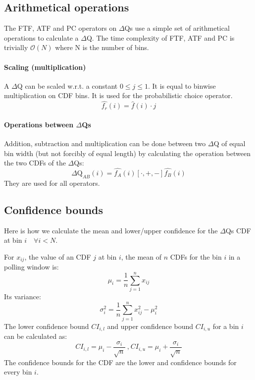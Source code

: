     \subsection{Arithmetical operations}
        The FTF, ATF and PC operators on $\Delta$Qs use a simple set of arithmetical operations to calculate a $\Delta$Q.   
    The time complexity of FTF, ATF and PC is trivially $\mathcal{O}(N)$ where N is the number of bins.
 
    \paragraph{Scaling (multiplication)} A $\Delta$Q can be scaled w.r.t. a constant $0 \le j \le 1$. It is equal to binwise multiplication on CDF bins. It is used for the probabilistic choice operator.
    \begin{equation}
        \hat{f_r}(i) = \hat{f}(i) \cdot j
        \label{eq:mul_ecdf}
    \end{equation}

    \paragraph{Operations between $\Delta$Qs} 
        Addition, subtraction and multiplication can be done between two $\Delta$Q of equal bin width (but not forcibly of equal length) by calculating the operation between the two CDFs of the $\Delta$Qs:
        \begin{equation}
            \Delta \text{Q}_{AB}(i) = \hat{f_A}(i) [\cdot, +, -] \hat{f_B}(i)
            \label{eq:op_dq}
        \end{equation}
    They are used for all operators.

    \subsection{Confidence bounds}
        Here is how we calculate the mean and lower/upper confidence for the $\Delta$Qs CDF at bin $i \quad \forall i < N$. \cite{stat}

        For $x_{ij}$, the value of an CDF $j$ at bin $i$, the mean of $n$ CDFs for the bin $i$ in a polling window is:
            \begin{equation}
                \mu_i = \dfrac{1}{n} \sum_{j=1}^{n} x_{ij}
                \label{eq:mean_ecdf}
            \end{equation}
        Its variance:
            \begin{equation}
                \sigma^2_i = \dfrac{1}{n} \sum_{j=1}^{n} x^2_{ij} - \mu^2_i
                \label{eq:var_ecdf}
            \end{equation}
        The lower confidence bound $CI_{i, l}$ and upper confidence bound $CI_{i, u}$ for a bin $i$ can be calculated as:
        \begin{equation}
                CI_{i, l} = \mu_i - \dfrac{\sigma_i}{\sqrt{n}} \ \text{,} \ CI_{i, u} = \mu_i + \dfrac{\sigma_i}{\sqrt{n}}
            \label{eq:ci_i}
        \end{equation}
        The confidence bounds for the CDF are the lower and confidence bounds for every bin $i$.

     
